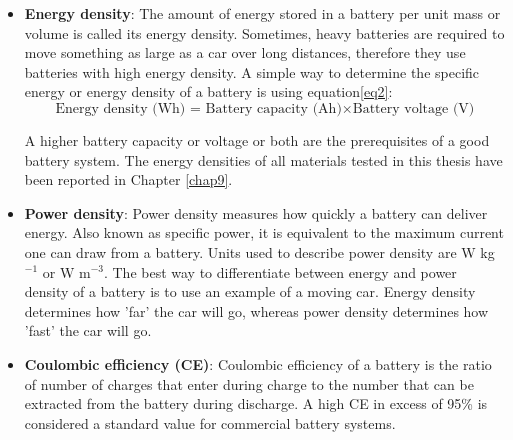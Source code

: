 \begin{itemize}
\item \textbf{Energy density}: The amount of energy stored in a battery per unit mass or volume is called its energy density. Sometimes, heavy batteries are required to move something as large as a car over long distances, therefore they use batteries with high energy density. A simple way to determine the specific energy or energy density of a battery is using equation\ref{eq2}:
\begin{equation} \label{eq2}
    \text{Energy density (Wh) = } \text{Battery capacity (Ah)} \times \text{Battery voltage (V)}
\end{equation}

A higher battery capacity or voltage or both are the prerequisites of a good battery system. The energy densities of all materials tested in this thesis have been reported in Chapter \ref{chap9}.

\item \textbf{Power density}: Power density measures how quickly a battery can deliver energy. Also known as specific power, it is equivalent to the maximum current one can draw from a battery. Units used to describe power density are W kg$^{-1}$ or W m$^{-3}$. The best way to differentiate between energy and power density of a battery is to use an example of a moving car. Energy density determines how 'far' the car will go, whereas power density determines how 'fast' the car will go.

\item \textbf{Coulombic efficiency (CE)}: Coulombic efficiency of a battery is the ratio of number of charges that enter during charge to the number that can be extracted from the battery during discharge. A high CE in excess of 95\% is considered a standard value for commercial battery systems. 
\end{itemize}

